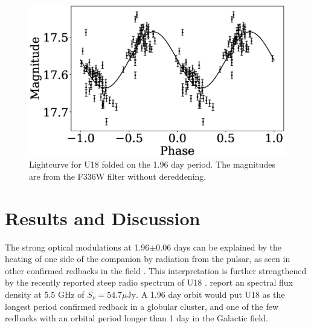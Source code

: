 \documentclass[fleqn,usenatbib,useAMS,letters]{mnras}
\begin{document}



 \begin{figure}
	\includegraphics[width =\columnwidth]{folded.eps}
	\vspace{-0.5 cm}
    \caption{Lightcurve for U18 folded on the 1.96 day period. The magnitudes are from the F336W filter without dereddening. }
    \label{fig:folded}
\end{figure}

 
 \section{Results and Discussion}
 

 
 The strong optical modulations at 1.96$\pm$0.06 days can be explained by the heating of one side of the companion by radiation from the pulsar, as seen in other confirmed redbacks in the field \citep[e.g.,][]{Hui2015PSR2219,salvetti2015J2039}.  This interpretation is further strengthened by the recently reported steep radio spectrum of U18 \citep{CoryPaper}. \citet{CoryPaper} report an spectral flux density at 5.5 GHz of $S_\nu =54.7 \mu\text{Jy}$. A 1.96 day orbit would put U18 as the longest period confirmed redback in a globular cluster, and one of the few redbacks with an orbital period longer than 1 day in the Galactic field.
 
\end{document}
